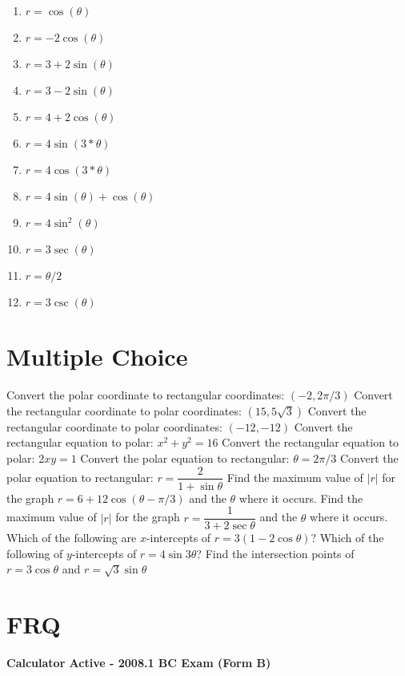 \documentclass[11pt]{exam}
\begin{document}
\vspace{2ex}
\begin{multicols}{3}
	\begin{enumerate}
		\item $r = \cos(\theta)$
		\item $r = -2 \cos(\theta)$
		\item $r = 3+2\sin(\theta)$
		\item $r = 3-2\sin(\theta)$
		\item $r=4+2\cos(\theta)$
		\item $r=4\sin(3*\theta)$
		\item $r=4\cos(3*\theta)$
		\item $r=4\sin(\theta)+\cos(\theta)$
		\item $r=4\sin^2(\theta)$
		\item $r = 3\sec(\theta)$
		\item $r = \theta/2$
		\item $r = 3\csc(\theta)$
	\end{enumerate}
	\end{multicols}
\clearpage
\section{Multiple Choice}
\begin{questions}
\question Convert the polar coordinate to rectangular coordinates: $(-2, 2\pi/3)$
\question Convert the rectangular coordinate to polar coordinates: $(15, 5\sqrt{3})$
\question Convert the rectangular coordinate to polar coordinates: $(-12, -12)$
\question Convert the rectangular equation to polar: $x^2 + y^2 = 16$
\question Convert the rectangular equation to polar: $2xy=1$
\question Convert the polar equation to rectangular: $\theta = 2\pi/3$
\question Convert the polar equation to rectangular: $r = \dfrac{2}{1 + \sin \theta}$
\question Find the maximum value of $|r|$ for the graph $r = 6 + 12 \cos(\theta - \pi/3)$ and the $\theta$ where it occurs.
\question Find the maximum value of $|r|$ for the graph $r = \dfrac{1}{3 + 2\sec{\theta}}$ and the $\theta$ where it occurs.
\question Which of the following are $x$-intercepts of $r = 3(1-2\cos\theta)$?
\question Which of the following of $y$-intercepts of $r = 4 \sin 3\theta$?
\question Find the intersection points of $r = 3 \cos \theta$ and $r = \sqrt3 \sin \theta$
\end{questions}

\section{FRQ}
\noindent
\textbf{Calculator Active - 2008.1 BC Exam (Form B)}
\vspace{2ex}
\end{document}
